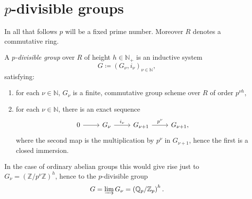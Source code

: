 \documentclass[../Main]{subfiles}
\begin{document}
\section{\texorpdfstring{$p$}{p}-divisible groups}
In all that follows $p$ will be a fixed prime number.
Moreover $R$ denotes a commutative ring.

\begin{defn}
	A {\em $p$-divisible group} over $R$ of height $h \in \mathbb{N}_+$ is an inductive system
	\begin{equation*}
	G \coloneqq \left(G_\nu, i_\nu\right)_{\nu \in \mathbb{N}}
	,\end{equation*} 
	satisfying:
	\begin{enumerate}
		\item for each $\nu \in \mathbb{N}$, $G_\nu$ is a finite, commutative group scheme over $R$
			of order $p^{\nu h}$,
		\item for each $\nu \in \mathbb{N}$, there is an exact sequence
			\begin{equation*}
			\begin{tikzcd}
				0 \arrow[r, "", rightarrow] &
				G_\nu \arrow[r, "i_\nu", rightarrow] &
				G_{\nu + 1} \arrow[r, "p^\nu", rightarrow] &
				G_{\nu + 1} 
			,\end{tikzcd}
			\end{equation*}
			where the second map is the multiplication by $p^\nu$ in $G_{\nu + 1}$,
			hence the first is a closed immersion.
	\end{enumerate}
\end{defn}

\begin{rem}[]
	In the case of ordinary abelian groups this would give rise just to 
	$G_\nu = \left( \mathbb{Z}/p^\nu\mathbb{Z} \right)^h$, hence to the $p$-divisible group
	\begin{equation*}
		G = \varinjlim G_\nu = \left( \mathbb{Q}_p / \mathbb{Z}_p \right)^h
	.\end{equation*} 
\end{rem}
\end{document}
